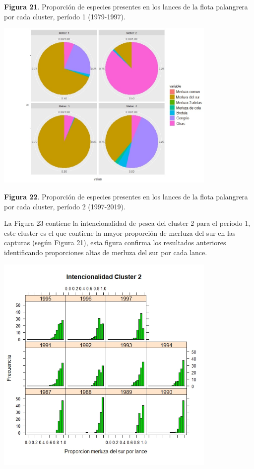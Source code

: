 \documentclass[
  spanish,
]{article}
\begin{document}
\small \textbf{Figura 21}. Proporción de especies presentes en los
lances de la flota palangrera por cada cluster, período 1 (1979-1997).
\vspace{0.5cm} \normalsize    

\begin{center}
\includegraphics[width=0.8\textwidth]{Figuras/Figura_22.png}
\end{center}

\small \textbf{Figura 22}. Proporción de especies presentes en los
lances de la flota palangrera por cada cluster, período 2 (1997-2019).
\vspace{0.5cm} \normalsize    

La Figura 23 contiene la intencionalidad de pesca del cluster 2 para el
período 1, este cluster es el que contiene la mayor proporción de
merluza del sur en las capturas (según Figura 21), esta figura confirma
los resultados anteriores identificando proporciones altas de merluza
del sur por cada lance.

\begin{center}
\includegraphics[width=0.8\textwidth]{Figuras/Figura_23.png}
\end{center}
\end{document}
